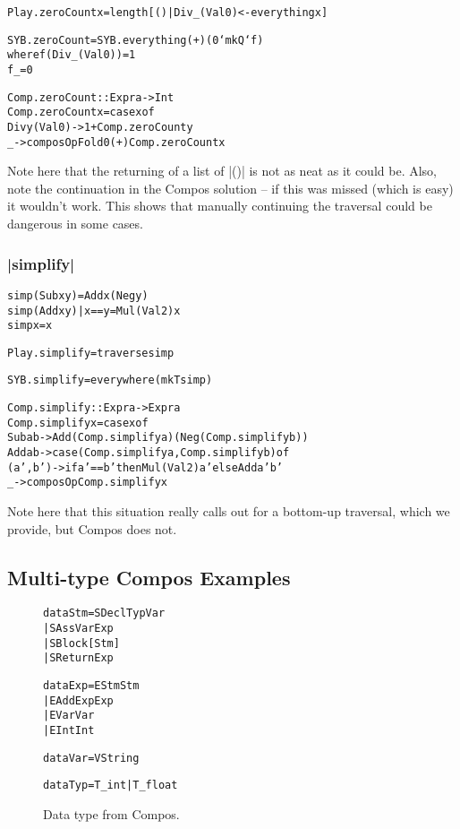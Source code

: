 \documentclass[preprint]{sigplanconf}
\newenvironment{code}{\begin{alltt}\small}{\end{alltt}}
\begin{document}
\begin{code}
Play.zeroCount x = length [() | Div _ (Val 0) <- everything x]

SYB.zeroCount = SYB.everything (+) (0 `mkQ` f)
    where  f (Div _ (Val 0))  = 1
           f _                  = 0

Comp.zeroCount :: Expr a -> Int
Comp.zeroCount x = case x of
    Div y (Val 0) -> 1 + Comp.zeroCount y
    _ -> composOpFold 0 (+) Comp.zeroCount x
\end{code}

Note here that the returning of a list of |()| is not as neat as it could be. Also, note the continuation in the Compos solution -- if this was missed (which is easy) it wouldn't work. This shows that manually continuing the traversal could be dangerous in some cases.

\subsubsection{|simplify|}

\begin{code}
simp (Sub x y)           = Add x (Neg y)
simp (Add x y) | x == y  = Mul (Val 2) x
simp x                   = x

Play.simplify = traverse simp

SYB.simplify = everywhere (mkT simp)

Comp.simplify :: Expr a -> Expr a
Comp.simplify x = case x of
    Sub  a b -> Add (Comp.simplify a) (Neg (Comp.simplify b))
    Add  a b -> case  (Comp.simplify a, Comp.simplify b) of
                      (a',b') -> if a' == b' then Mul (Val 2) a' else Add a' b'
    _ -> composOp Comp.simplify x
\end{code}

Note here that this situation really calls out for a bottom-up traversal, which we provide, but Compos does not.


\subsection{Multi-type Compos Examples}

\begin{figure}
\begin{code}
data Stm  =  SDecl    Typ Var
          |  SAss     Var Exp
          |  SBlock   [Stm]
          |  SReturn  Exp

data Exp = EStm  Stm
         | EAdd  Exp Exp
         | EVar  Var
         | EInt  Int

data Var = V String

data Typ = T_int | T_float
\end{code}
\caption{Data type from Compos.}
\label{fig:compos}
\end{figure}
\end{document}
